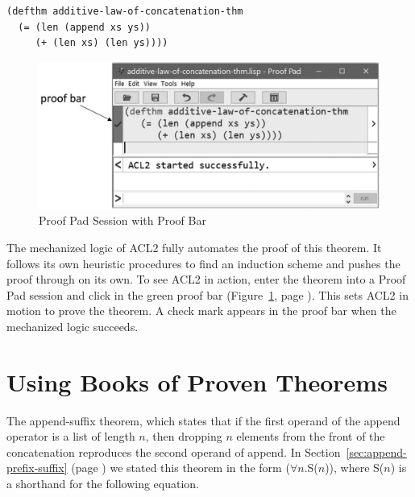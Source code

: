 \begin{code}
\begin{verbatim}
(defthm additive-law-of-concatenation-thm
  (= (len (append xs ys))
     (+ (len xs) (len ys))))
\end{verbatim}
\end{code}

\begin{figure}
\begin{center}
\includegraphics[scale=1]{images-cmyk/additive-law-of-concatenation-thm-acl2-prf-bw}
\end{center}
\caption{Proof Pad Session with Proof Bar}
\label{fig:proof-bar-with-chk}
\end{figure}

The mechanized logic of ACL2 fully automates the proof of this theorem.
It follows its own heuristic procedures to find an induction scheme
and pushes the proof through on its own.
To see ACL2 in action, enter the theorem into a Proof Pad session
and click in the green proof bar
(Figure~\ref{fig:proof-bar-with-chk}, page \pageref{fig:proof-bar-with-chk}).
This sets ACL2 in motion to prove the theorem.
A check mark appears in the proof bar
when the mechanized logic succeeds.

\section{Using Books of Proven Theorems}
\label{sec:using-books-of-proven-theorems}

The append-suffix theorem, which states that
if the first operand of the \textsf{append} operator is a list of length $n$,
then dropping $n$ elements from the front of the concatenation
reproduces the second operand of \textsf{append}.
In Section~\ref{sec:append-prefix-suffix} (page \pageref{append-suffix-thm-pencil-proof})
we stated this theorem in the form ($\forall$$n$.S($n$)),
where S($n$) is a shorthand for the following equation.

